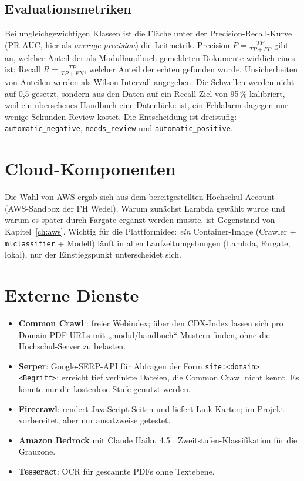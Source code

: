 \subsection{Evaluationsmetriken}
Bei ungleichgewichtigen Klassen ist die Fläche unter der Precision-Recall-Kurve (PR-AUC, hier als \emph{average precision}) die Leitmetrik. Precision $P=\frac{TP}{TP+FP}$ gibt an, welcher Anteil der als Modulhandbuch gemeldeten Dokumente wirklich eines ist; Recall $R=\frac{TP}{TP+FN}$, welcher Anteil der echten gefunden wurde. Unsicherheiten von Anteilen werden als Wilson-Intervall \citep{wilson1927} angegeben. Die Schwellen werden nicht auf 0,5 gesetzt, sondern aus den Daten auf ein Recall-Ziel von 95\,\% kalibriert, weil ein übersehenes Handbuch eine Datenlücke ist, ein Fehlalarm dagegen nur wenige Sekunden Review kostet. Die Entscheidung ist dreistufig: \texttt{automatic\_negative}, \texttt{needs\_review} und \texttt{automatic\_positive}.

\section{Cloud-Komponenten}
Die Wahl von AWS ergab sich aus dem bereitgestellten Hochschul-Account (AWS-Sandbox der FH Wedel). Warum zunächst Lambda gewählt wurde und warum es später durch Fargate ergänzt werden musste, ist Gegenstand von Kapitel~\ref{ch:aws}. Wichtig für die Plattformidee: \emph{ein} Container-Image (Crawler + \texttt{mlclassifier} + Modell) läuft in allen Laufzeitumgebungen (Lambda, Fargate, lokal), nur der Einstiegspunkt unterscheidet sich.

\section{Externe Dienste}
\begin{itemize}
  \item \textbf{Common Crawl} \citep{commoncrawl}: freier Webindex; über den CDX-Index lassen sich pro Domain PDF-URLs mit „modul/handbuch“-Mustern finden, ohne die Hochschul-Server zu belasten.
  \item \textbf{Serper}: Google-SERP-API für Abfragen der Form \texttt{site:<domain> <Begriff>}; erreicht tief verlinkte Dateien, die Common Crawl nicht kennt. Es konnte nur die kostenlose Stufe genutzt werden.
  \item \textbf{Firecrawl}: rendert JavaScript-Seiten und liefert Link-Karten; im Projekt vorbereitet, aber nur ansatzweise getestet.
  \item \textbf{Amazon Bedrock} mit Claude Haiku 4.5 \citep{anthropic2025haiku}: Zweitstufen-Klassifikation für die Grauzone.
  \item \textbf{Tesseract}: OCR für gescannte PDFs ohne Textebene.
\end{itemize}
